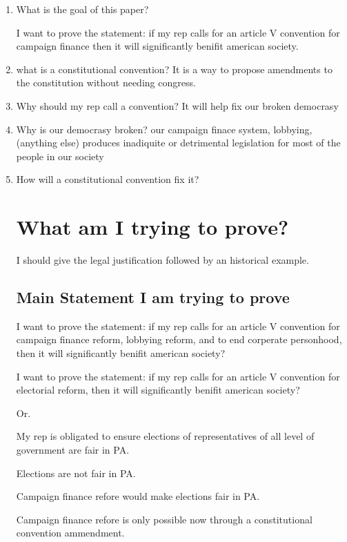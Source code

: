 \documentclass[11pt]{article} %
\begin{document}
\begin{enumerate}

\item  What is the goal of this paper?

I want to prove the statement: if my rep calls for an article V convention for campaign finance then it will significantly benifit american society.

\item what is a constitutional convention? It is a way to propose amendments to the constitution without needing congress. 

\item  Why should my rep call a convention?
 It will help fix our broken democrasy

\item Why is our democrasy broken?
our campaign finace system, lobbying, (anything else) produces inadiquite or detrimental legislation for most of the people in our society 

\item How will a constitutional convention fix it?

\section{What am I trying to prove?}
  I should give the legal justification followed by an historical example. 
\subsection{Main Statement I am trying to prove}

I want to prove the statement: if my rep calls for an article V convention for campaign finance reform, lobbying reform, and to end corperate personhood,  then it will significantly benifit american society? 

I want to prove the statement: if my rep calls for an article V convention for electorial reform,  then it will significantly benifit american society? 


Or.  

My rep is obligated to ensure elections of representatives of all level of government are fair in PA. 

Elections are not fair in PA.

Campaign finance refore would make elections fair in PA. 

Campaign finance refore is only possible now through a constitutional convention ammendment. 


\end{enumerate}
\end{document}

